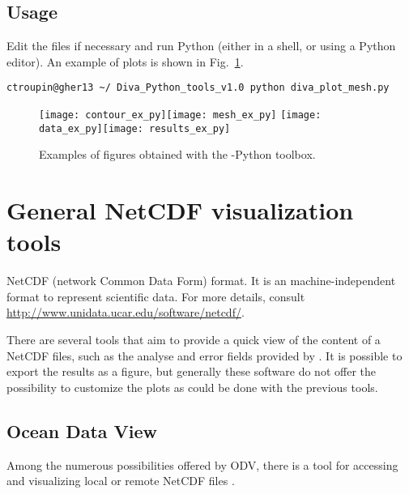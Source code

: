 \subsection{Usage}

Edit the files if necessary and run Python (either in a shell, or using a Python editor). An example of plots is shown in Fig.~\ref{fig:pythontoolbox}.

\begin{lstlisting}[style=Bash]
ctroupin@gher13 ~/ Diva_Python_tools_v1.0 python diva_plot_mesh.py
\end{lstlisting}

\begin{figure}[htpb]
\centering
\texttt{[image: contour\_ex\_py]}\texttt{[image: mesh\_ex\_py]}
\texttt{[image: data\_ex\_py]}\texttt{[image: results\_ex\_py]}
\caption{Examples of figures obtained with the \diva-Python toolbox.\label{fig:pythontoolbox}}
\end{figure}


\section[NetCDF visualization tools]{General NetCDF visualization tools}

NetCDF (network Common Data Form) format. It is an machine-independent format to represent scientific data. For more details, consult \url{http://www.unidata.ucar.edu/software/netcdf/}. 

There are several tools that aim to provide a quick view of the content of a NetCDF files, such as the analyse and error fields provided by \diva. It is possible to export the results as a figure, but generally these software do not offer the possibility to customize the plots as could be done with the previous tools.

\subsection{Ocean Data View}

Among the numerous possibilities offered by ODV, there is a tool for accessing and visualizing local or remote NetCDF files \citep[][Chapter~13]{SCHLITZER12}.



